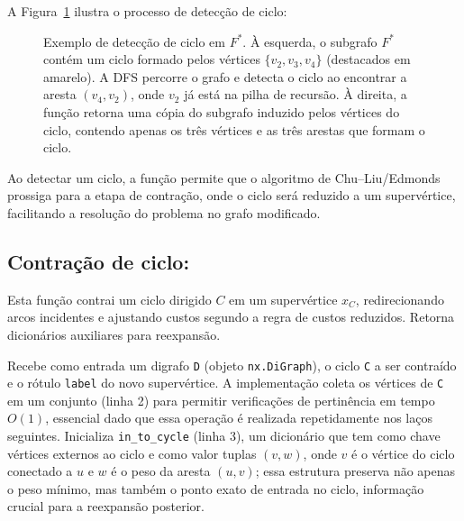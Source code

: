 A Figura~\ref{fig:find-cycle-example} ilustra o processo de detecção de ciclo:

\begin{figure}[H]
    \centering
    
    \caption{Exemplo de detecção de ciclo em \(F^*\). À esquerda, o subgrafo \(F^*\) contém um ciclo formado pelos vértices \(\{v_2, v_3, v_4\}\) (destacados em amarelo). A DFS percorre o grafo e detecta o ciclo ao encontrar a aresta \((v_4, v_2)\), onde \(v_2\) já está na pilha de recursão. À direita, a função retorna uma cópia do subgrafo induzido pelos vértices do ciclo, contendo apenas os três vértices e as três arestas que formam o ciclo.}
    \label{fig:find-cycle-example}
\end{figure}

Ao detectar um ciclo, a função permite que o algoritmo de Chu–Liu/Edmonds prossiga para a etapa de contração, onde o ciclo será reduzido a um supervértice, facilitando a resolução do problema no grafo modificado.

\subsection{Contração de ciclo:}
Esta função contrai um ciclo dirigido \(C\) em um supervértice \(x_C\), redirecionando arcos incidentes e ajustando custos segundo a regra de custos reduzidos. Retorna dicionários auxiliares para reexpansão.

Recebe como entrada um digrafo \texttt{D} (objeto \texttt{nx.DiGraph}), o ciclo \texttt{C} a ser contraído e o rótulo \texttt{label} do novo supervértice. A implementação coleta os vértices de \texttt{C} em um conjunto (linha 2) para permitir verificações de pertinência em tempo \(O(1)\), essencial dado que essa operação é realizada repetidamente nos laços seguintes. Inicializa \texttt{in\_to\_cycle} (linha 3), um dicionário que tem como chave vértices externos ao ciclo e como valor tuplas \((v,w)\), onde \(v\) é o vértice do ciclo conectado a \(u\) e \(w\) é o peso da aresta \((u,v)\); essa estrutura preserva não apenas o peso mínimo, mas também o ponto exato de entrada no ciclo, informação crucial para a reexpansão posterior.

